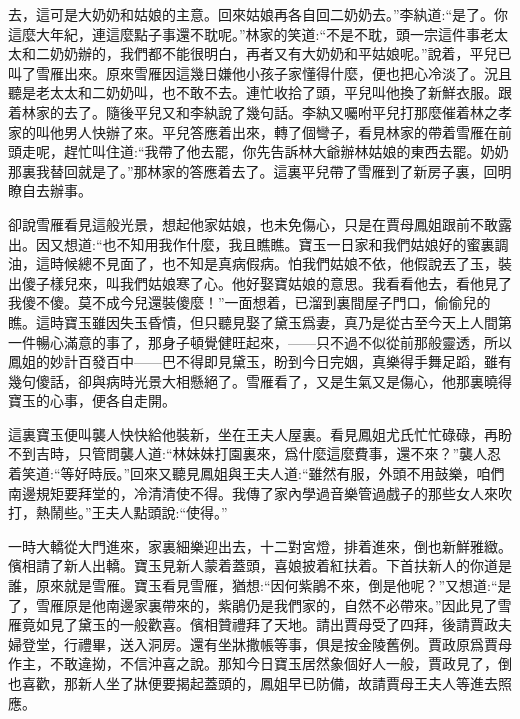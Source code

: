 \begin{parag}
去，這可是大奶奶和姑娘的主意。回來姑娘再各自回二奶奶去。”李紈道:“是了。你這麼大年紀，連這麼點子事還不耽呢。”林家的笑道:“不是不耽，頭一宗這件事老太太和二奶奶辦的，我們都不能很明白，再者又有大奶奶和平姑娘呢。”說着，平兒已叫了雪雁出來。原來雪雁因這幾日嫌他小孩子家懂得什麼，便也把心冷淡了。況且聽是老太太和二奶奶叫，也不敢不去。連忙收拾了頭，平兒叫他換了新鮮衣服。跟着林家的去了。隨後平兒又和李紈說了幾句話。李紈又囑咐平兒打那麼催着林之孝家的叫他男人快辦了來。平兒答應着出來，轉了個彎子，看見林家的帶着雪雁在前頭走呢，趕忙叫住道:“我帶了他去罷，你先告訴林大爺辦林姑娘的東西去罷。奶奶那裏我替回就是了。”那林家的答應着去了。這裏平兒帶了雪雁到了新房子裏，回明瞭自去辦事。
\end{parag}


\begin{parag}
    卻說雪雁看見這般光景，想起他家姑娘，也未免傷心，只是在賈母鳳姐跟前不敢露出。因又想道:“也不知用我作什麼，我且瞧瞧。寶玉一日家和我們姑娘好的蜜裏調油，這時候總不見面了，也不知是真病假病。怕我們姑娘不依，他假說丟了玉，裝出傻子樣兒來，叫我們姑娘寒了心。他好娶寶姑娘的意思。我看看他去，看他見了我傻不傻。莫不成今兒還裝傻麼！”一面想着，已溜到裏間屋子門口，偷偷兒的瞧。這時寶玉雖因失玉昏憒，但只聽見娶了黛玉爲妻，真乃是從古至今天上人間第一件暢心滿意的事了，那身子頓覺健旺起來，——只不過不似從前那般靈透，所以鳳姐的妙計百發百中——巴不得即見黛玉，盼到今日完姻，真樂得手舞足蹈，雖有幾句傻話，卻與病時光景大相懸絕了。雪雁看了，又是生氣又是傷心，他那裏曉得寶玉的心事，便各自走開。
\end{parag}


\begin{parag}
    這裏寶玉便叫襲人快快給他裝新，坐在王夫人屋裏。看見鳳姐尤氏忙忙碌碌，再盼不到吉時，只管問襲人道:“林妹妹打園裏來，爲什麼這麼費事，還不來？”襲人忍着笑道:“等好時辰。”回來又聽見鳳姐與王夫人道:“雖然有服，外頭不用鼓樂，咱們南邊規矩要拜堂的，冷清清使不得。我傳了家內學過音樂管過戲子的那些女人來吹打，熱鬧些。”王夫人點頭說:“使得。”
\end{parag}


\begin{parag}
    一時大轎從大門進來，家裏細樂迎出去，十二對宮燈，排着進來，倒也新鮮雅緻。儐相請了新人出轎。寶玉見新人蒙着蓋頭，喜娘披着紅扶着。下首扶新人的你道是誰，原來就是雪雁。寶玉看見雪雁，猶想:“因何紫鵑不來，倒是他呢？”又想道:“是了，雪雁原是他南邊家裏帶來的，紫鵑仍是我們家的，自然不必帶來。”因此見了雪雁竟如見了黛玉的一般歡喜。儐相贊禮拜了天地。請出賈母受了四拜，後請賈政夫婦登堂，行禮畢，送入洞房。還有坐牀撒帳等事，俱是按金陵舊例。賈政原爲賈母作主，不敢違拗，不信沖喜之說。那知今日寶玉居然象個好人一般，賈政見了，倒也喜歡，那新人坐了牀便要揭起蓋頭的，鳳姐早已防備，故請賈母王夫人等進去照應。
\end{parag}


